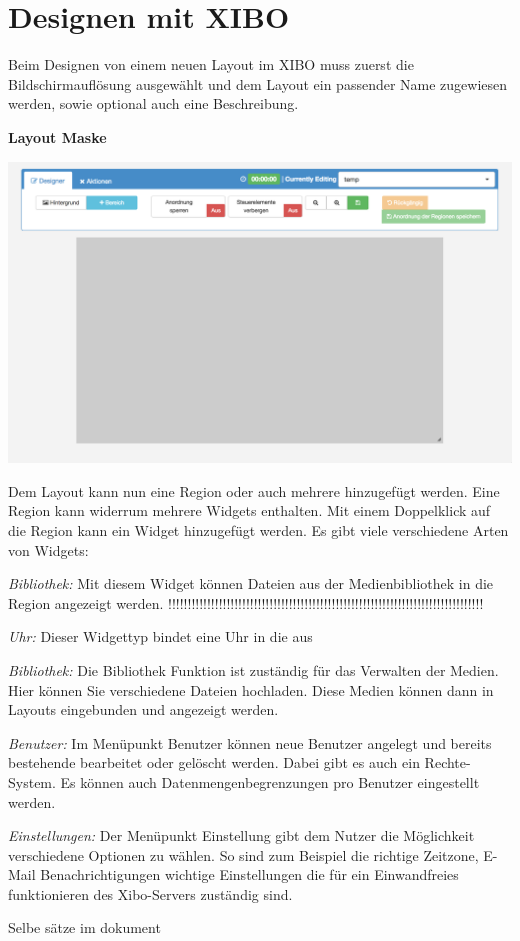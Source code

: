 \section{Designen mit XIBO}\label{sec:designexibo}
Beim Designen von einem neuen Layout im XIBO muss zuerst die Bildschirmauflösung ausgewählt und dem Layout ein passender Name zugewiesen werden, sowie optional auch eine Beschreibung. 

\textbf{Layout Maske}

\begin{calendar}
	\centering
\includegraphics[width=1\textwidth]{images/xibo-basics-designer}
	\label{Calendar}
\end{calendar}	

Dem Layout kann nun eine Region oder auch mehrere  hinzugefügt werden. Eine Region kann widerrum mehrere Widgets enthalten. Mit einem Doppelklick auf die Region kann ein Widget hinzugefügt werden. Es gibt viele verschiedene Arten von Widgets:

\begin{widgettypes}
	\item {\em Bibliothek:} Mit diesem Widget können Dateien aus der Medienbibliothek in die Region angezeigt werden. 
!!!!!!!!!!!!!!!!!!!!!!!!!!!!!!!!!!!!!!!!!!!!!!!!!!!!!!!!!!!!!!!!!!!!!!!!!!!!!!!!!
	
	\item {\em Uhr:} 
	Dieser Widgettyp bindet eine Uhr in die aus
	
	\item {\em Bibliothek:} 
	Die Bibliothek Funktion ist zuständig für das Verwalten der Medien. Hier können Sie verschiedene Dateien hochladen.  Diese Medien können dann in Layouts eingebunden und angezeigt werden.
	
	\item {\em Benutzer:} 
	Im Menüpunkt Benutzer können neue Benutzer angelegt und bereits bestehende bearbeitet oder gelöscht werden. Dabei gibt es auch ein Rechte-System. Es können auch Datenmengenbegrenzungen pro Benutzer eingestellt werden.
	
	\item {\em Einstellungen:} 
	Der Menüpunkt Einstellung gibt dem Nutzer die Möglichkeit verschiedene Optionen zu wählen. So sind zum Beispiel die richtige Zeitzone, E-Mail Benachrichtigungen wichtige Einstellungen die für ein Einwandfreies funktionieren des Xibo-Servers zuständig sind.
\end{widgettypes}



Selbe sätze im dokument